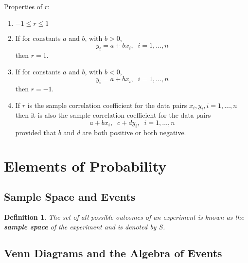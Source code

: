 \documentclass[12pt]{article}
\newtheorem{definition}[theorem]{Definition}
\begin{document}
Properties of $r$:
\begin{enumerate}
  \item $-1 \le r \le 1$
  \item If for constants $a$ and $b$, with $b>0$,
    \begin{equation*}
      y_i = a + b x_i, \;\; i = 1,\dots,n
    \end{equation*}
    then $r = 1$.
  \item If for constants $a$ and $b$, with $b<0$,
    \begin{equation*}
      y_i = a + b x_i, \;\; i = 1,\dots,n
    \end{equation*}
    then $r = -1$.
  \item If $r$ is the sample correlation coefficient for the data pairs $x_i, y_i,i=1,\dots,n$ then it is also the sample correlation coefficient for the data pairs
    \begin{equation*}
      a + b x_i, \;\; c + d y_i, \;\; i = 1,\dots,n
    \end{equation*}
    provided that $b$ and $d$ are both positive or both negative.
\end{enumerate}

\section{Elements of Probability}

\subsection{Sample Space and Events}

\begin{definition}
  The set of all possible outcomes of an experiment is known as the \textbf{sample space} of the experiment and is denoted by $S$.
\end{definition}

\subsection{Venn Diagrams and the Algebra of Events}
\end{document}
